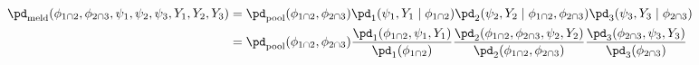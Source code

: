 \begin{align}
  \pd_{\text{meld}} (\phi_{1 \cap 2}, \phi_{2 \cap 3}, \psi_{1}, \psi_{2}, \psi_{3}, Y_{1}, Y_{2}, Y_{3})  &=   
    \pd_{\text{pool}}(\phi_{1 \cap 2}, \phi_{2 \cap 3})
    \pd_{1} (\psi_{1}, Y_{1} \mid \phi_{1 \cap 2})
    \pd_{2} (\psi_{2}, Y_{2} \mid \phi_{1 \cap 2}, \phi_{2 \cap 3})
    \pd_{3} (\psi_{3}, Y_{3} \mid \phi_{2 \cap 3})  
    \\ &= 
    \pd_{\text{pool}}(\phi_{1 \cap 2}, \phi_{2 \cap 3})
    \frac {
      \pd_{1} (\phi_{1 \cap 2}, \psi_{1}, Y_{1})
    } {
      \pd_{1}(\phi_{1 \cap 2})
    }
    \frac {
      \pd_{2} (\phi_{1 \cap 2}, \phi_{2 \cap 3}, \psi_{2}, Y_{2})
    } {
      \pd_{2}(\phi_{1 \cap 2}, \phi_{2 \cap 3})
    }
    \frac {
      \pd_{3} (\phi_{2 \cap 3}, \psi_{3}, Y_{3})
    } {
      \pd_{3}(\phi_{2 \cap 3})
    }  
  \label{eqn:melded-model}
\end{align}